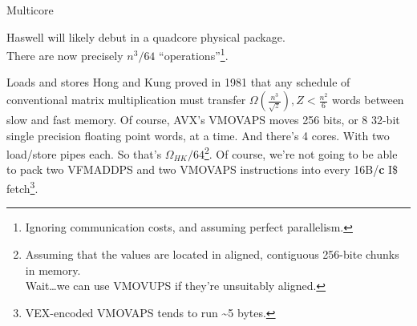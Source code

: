 \documentclass[mathserif,xcolor={dvipsnames,table}]{beamer}
\begin{document}
{
%
\begin{frame}[b]{Multicore}
\scriptsize{
\begin{block}{}
Haswell will likely debut in a quadcore physical package.\\
There are now precisely $n^{3}/64$ ``operations''\footnote{\tiny{Ignoring communication
costs, and assuming perfect parallelism.}}.
\end{block}
\vspace{.1in}
}
\end{frame}
}

\begin{frame}{Loads and stores}
Hong and Kung proved in 1981 that any schedule of conventional matrix
multiplication must transfer $\Omega(\frac{n^{3}}{\sqrt{z}}), Z<\frac{n^{2}}{6}$
words between slow and fast memory.
\vfill
Of course, AVX's VMOVAPS moves 256 bits, or 8 32-bit single precision floating
point words, at a time. And there's 4 cores. With two load/store pipes each. So that's $\Omega_{HK}/64$\footnote{
\tiny{Assuming that the values are located in aligned, contiguous 256-bite chunks in memory.\\
\hspace{.6cm}Wait\ldots we can use VMOVUPS if they're unsuitably aligned.}}.
\vfill
Of course, we're not going to be able to pack two VFMADDPS and two VMOVAPS
instructions into every 16B/\textbf{c} I\$ fetch\footnote{\tiny{VEX-encoded
VMOVAPS tends to run \textasciitilde 5 bytes.}}.
\end{frame}
\end{document}
